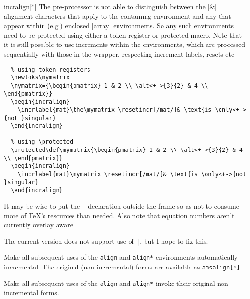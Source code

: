 \documentclass[a4paper]{ltxdoc}
\begin{document}
\begin{environment}{{incralign[*]}}
    The pre-processor is not able to distinguish between the |&| alignment
    characters that apply to the containing environment and any that appear
    within (e.g.) enclosed |array| environments.  So any such environments need
    to be protected using either a token register or protected macro.  Note that
    it is still possible to use increments within the environments, which are
    processed sequentially with those in the wrapper, respecting increment
    labels, resets etc.

    \example
\begin{verbatim}
  % using token registers
  \newtoks\mymatrix
  \mymatrix={\begin{pmatrix} 1 & 2 \\ \alt<+->{3}{2} & 4 \\ \end{pmatrix}}
  \begin{incralign}
    \incrlabel{mat}\the\mymatrix \resetincr[/mat/]& \text{is \only<+->{not }singular}
  \end{incralign}

  % using \protected
  \protected\def\mymatrix{\begin{pmatrix} 1 & 2 \\ \alt<+->{3}{2} & 4 \\ \end{pmatrix}}
  \begin{incralign}
    \incrlabel{mat}\mymatrix \resetincr[/mat/]& \text{is \only<+->{not }singular}
  \end{incralign}

\end{verbatim}
    It may be wise to put the |\newtoks| declaration outside the frame so as not
    to consume more of \TeX's resources than needed.  Also note that equation
    numbers aren't currently overlay aware.

    The current version does not support use of |\intertext|, but I hope to fix this.
\end{environment}



\begin{command}{\makealignincremental}
  Make all subsequent uses of the \texttt{align} and \texttt{align*}
  environments automatically incremental.  The original (non-incremental) forms
  are available as \texttt{amsalign[*]}.
\end{command}

\begin{command}{\makealignams}
  Make all subsequent uses of the \texttt{align} and \texttt{align*} invoke
  their original non-incremental forms.  
\end{command}
\end{document}
